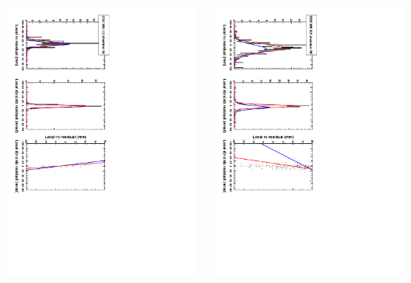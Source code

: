 \documentclass[compress]{beamer}
\begin{document}
\begin{frame}
\begin{columns}
\includegraphics[height=\linewidth, angle=90]{datafit_csc_me13.pdf}

\includegraphics[height=\linewidth, angle=90]{datafit_csc_me32_agrees.pdf}
\end{columns}
\end{frame}
\end{document}
